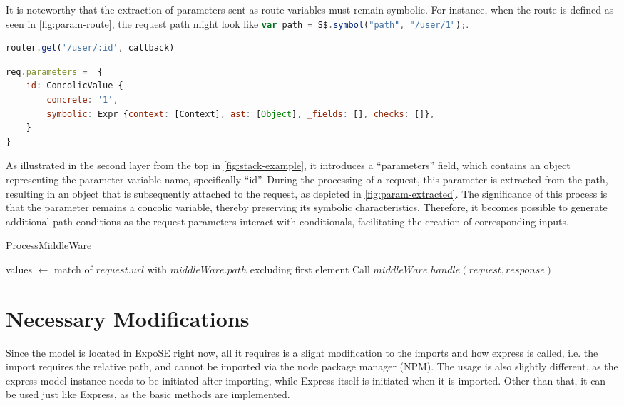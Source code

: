 It is noteworthy that the extraction of parameters sent as route variables must remain symbolic. For instance, when the route is defined as seen in \autoref{fig:param-route}, the request path might look like \lstinline[language=JavaScript]{var path = S$.symbol("path", "/user/1");}.


\begin{lstlisting}[language=JavaScript,label={fig:param-route},caption={A parameterized route.}, float]
router.get('/user/:id', callback) 
\end{lstlisting}

\begin{lstlisting}[language=JavaScript, gobble=4,caption={Parameters extracted from the request path.},label={fig:param-extracted}, float]
req.parameters =  {
    id: ConcolicValue {
        concrete: '1',
        symbolic: Expr {context: [Context], ast: [Object], _fields: [], checks: []},
    }
}
\end{lstlisting}
As illustrated in the second layer from the top in \autoref{fig:stack-example}, it  introduces a “parameters” field, which contains an object representing the parameter variable name, specifically “id”. During the processing of a request, this parameter is extracted from the path, resulting in an object that is subsequently attached to the request, as depicted in \autoref{fig:param-extracted}.
The significance of this process is that the parameter remains a concolic variable, thereby preserving its symbolic characteristics. Therefore, it becomes possible to generate additional path conditions as the request parameters interact with conditionals, facilitating the creation of corresponding inputs.

\begin{algorithm}[t]
\caption{ProcessMiddleWare}
values $\gets$ match of $request.url$ with $middleWare.path$ excluding first element\;
Call $middleWare.handle(request, response)$\;
\end{algorithm}


\section{Necessary Modifications} 
\label{sec:nec-mods}

Since the model is located in ExpoSE right now, all it requires is a slight modification to the imports and how express is called, i.e. the import requires the relative path, and cannot be imported via the node package manager (NPM). 
The usage is also slightly different, as the express model instance needs to be initiated after importing, while Express itself is initiated when it is imported. 
Other than that, it can be used just like Express, as the basic methods are implemented.


